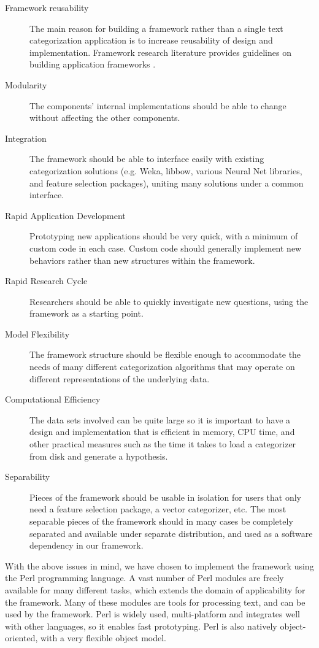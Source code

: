 \documentclass[twocolumn]{article}
\begin{document}
\begin{description}
\item[Framework reusability] The main reason for building a framework rather than a single text categorization application is to increase reusability of design and implementation.  Framework research literature provides guidelines on building application frameworks \cite{fayad:99}.
\item[Modularity] The components' internal implementations should be able to change  without affecting the other components.
\item[Integration] The framework should be able to interface easily with existing categorization solutions (e.g. Weka, libbow, various Neural Net libraries, and feature selection packages), uniting many solutions under a common interface.
\item[Rapid Application Development] Prototyping new applications should be very quick, with a minimum of custom code in each case.  Custom code should generally implement new behaviors rather than new structures within the framework.
\item[Rapid Research Cycle] Researchers should be able to quickly investigate new questions, using the framework as a starting point.
\item[Model Flexibility] The framework structure should be flexible enough to accommodate the needs of many different categorization algorithms that may operate on different representations of the underlying data.
\item[Computational Efficiency] The data sets involved can be quite
large so it is important to have a design and implementation that is
efficient in memory, CPU time, and other practical measures such as
the time it takes to load a categorizer from disk and generate a
hypothesis.
\item[Separability] Pieces of the framework should be usable in isolation for users that only need a feature selection package, a vector categorizer, etc.  The most separable pieces of the framework should in many cases be completely separated and available under separate distribution, and used as a software dependency in our framework.
\end{description}

With the above issues in mind, we have chosen to implement the
framework using the Perl programming language. \cite{Wall:00} A vast
number of Perl modules are freely available for many different tasks,
which extends the domain of applicability for the framework. Many of
these modules are tools for processing text, and can be used by the
framework. Perl is widely used, multi-platform and integrates well
with other languages, so it enables fast prototyping. Perl is also
natively object-oriented, with a very flexible object
model. \cite{conway:99}
\end{document}
